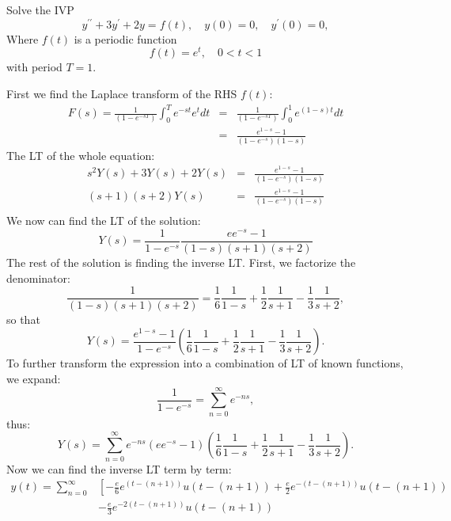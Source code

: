 \documentclass[11pt]{article}
\begin{document}
\begin{problem}
Solve the IVP
\[ y^{\prime \prime} + 3 y^{\prime} + 2y = f(t), \quad y(0) = 0, \quad y^{\prime}(0) = 0, \]
Where $f(t)$ is a periodic function
\[ f(t) = e^t, \quad 0 < t < 1\]
with period $T=1$.
\end{problem}
\begin{solution}
  First we find the Laplace transform of the RHS $f(t)$:
  \begin{eqnarray*}
    F(s) = \frac {1} {(1 - e^{-sT})} \int_0^T e^{-st} e^t dt
    & = & \frac {1} {(1 - e^{-sT})}  \int_0^1 e^{(1 - s)t} dt\\
    & = & \frac { e^{1 - s} - 1} {(1 - e^{-s}) (1 - s)}
  \end{eqnarray*}
  The LT of the whole equation:
  \begin{eqnarray*}
    s^2 Y(s) + 3Y(s) + 2Y(s) & = & \frac { e^{1 - s} - 1} {(1 - e^{-s})(1 - s)} \\
    \left( s + 1 \right) \left( s + 2 \right) Y(s)
                             & = & \frac { e^{1 - s} - 1} {(1 - e^{-s})(1 - s)} \\
  \end{eqnarray*}
  We now can find the LT of the solution:
  \[
    Y(s) = \frac {1} {1 - e^{-s}} \frac {e e^{-s} - 1} {(1 - s) (s + 1) (s + 2)}
  \]
  The rest of the solution is finding the inverse LT. First, we factorize the denominator:
  \[
    \frac {1} {(1 - s) (s + 1) (s + 2)} = \frac {1} {6} \frac {1} {1 - s}
    + \frac {1} {2} \frac {1} {s + 1} - \frac {1} {3} \frac {1} {s + 2},
  \]
  so that
  \[
    Y(s) = \frac { e^{1 - s} - 1} {1 - e^{-s}}
    \left(  \frac {1} {6} \frac {1} {1 - s}
      + \frac {1} {2} \frac {1} {s + 1} - \frac {1} {3} \frac {1} {s + 2} \right).
  \]
  To further transform the expression into a combination of LT of known functions,
  we expand:
  \[
    \frac {1} {1 - e^{-s}} = \sum_{n = 0}^{\infty} e^{-ns},
  \]
  thus:
  \[
    Y(s) = \sum_{n = 0}^{\infty} e^{-ns} \left( e e^{- s} - 1 \right)
    \left(  \frac {1} {6} \frac {1} {1 - s}
      + \frac {1} {2} \frac {1} {s + 1} - \frac {1} {3} \frac {1} {s + 2} \right).
  \]
  Now we can find the inverse LT term by term:
  \begin{equation}
    \begin{aligned}
      y(t) = \sum_{n = 0}^{\infty} & \left[
        - \frac {e} {6} e^{\left( t - (n + 1) \right)} u\left( t - (n + 1) \right)
        + \frac {e} {2} e^{ - \left( t - (n + 1) \right)} u\left( t - (n + 1) \right) \right. \\
        & \left. - \frac {e} {3} e^{ -2 \left( t - (n + 1) \right)} u\left( t - (n + 1) \right)

\end{aligned}
\end{equation}
\end{solution}
\end{document}
